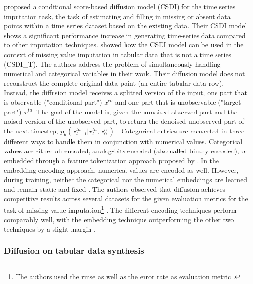 \textcite{tashiro2021CSDIConditionalScorebased} proposed a conditional score-based diffusion \gls{model} (CSDI) for the time series imputation task, \ie the task of estimating and filling in missing or absent data points within a time series dataset based on the existing data.
Their CSDI \gls{model} shows a significant performance increase in generating time-series data compared to other imputation techniques.
\textcite{zheng2022DiffusionModelsMissing} showed how the CSDI \gls{model} can be used in the context of missing value imputation in tabular data that is not a time series (CSDI\_T).
The authors address the problem of simultaneously handling numerical and categorical variables in their work.
Their diffusion \gls{model} does not reconstruct the complete original data point (\eg an entire tabular data row). 
Instead, the diffusion \gls{model} receives a splitted version of the input, one part that is observable ("conditional part") $x^{co}$ and one part that is unobservable ("target part") $x^{ta}$.
The goal of the \gls{model} is, given the unnoised observed part and the noised version of the unobserved part, to return the denoised unobserved part of the next timestep, 
\ie $p_\theta(x^{ta}_{t-1}|x^{ta}_{t},x^{co}_{0})$ \cite{zheng2022DiffusionModelsMissing}.
Categorical entries are converted in three different ways to handle them in conjunction with numerical values.
Categorical values are either \gls{oh} encoded, analog-bits encoded (also called binary encoded), or embedded through a feature tokenization approach proposed by \cite{gorishniy2021RevisitingDeepLearning}.
In the embedding encoding approach, numerical values are encoded as well. 
However, during training, neither the categorical nor the numerical embeddings are learned and remain static and fixed \cite{zheng2023DiffusionModelsMissing}.
The authors observed that diffusion achieves competitive results across several datasets for the given evaluation metrics for the task of missing value imputation\footnote{The authors used the \gls{rmse} as well as the error rate as evaluation metric \cite[p. 2]{zheng2023DiffusionModelsMissing}.} \cite{zheng2022DiffusionModelsMissing}.
The different encoding techniques perform comparably well, with the embedding technique outperforming the other two techniques by a slight margin \cite{zheng2022DiffusionModelsMissing}.


\subsubsection{Diffusion on tabular data synthesis}
\label{ch:relatedWork-diffusionModels-tabDDPM}

